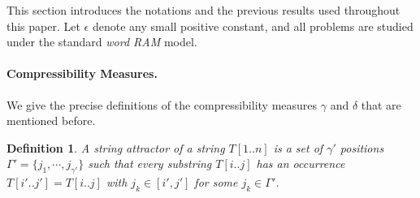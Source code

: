 \documentclass[smallabstract,smallcaptions]{dccpaper}
\newtheorem{definition}{Definition}
\newtheorem{theorem}{Theorem}
\begin{document}
	
	
	This section introduces the notations and the previous results used throughout this paper. Let $\epsilon$ denote any small positive constant, and all problems are studied under the standard {\em word RAM} model.
	
	\paragraph{Compressibility Measures.} We give the precise definitions of the compressibility measures $\gamma$ and $\delta$ that are mentioned before.
	
	\begin{definition}\cite{kempa2018roots}
		A string attractor of a string $T[1..n]$ is a set of $\gamma'$ positions $\Gamma'= \{j_1, \cdots, j_{\gamma'}\}$ such that every substring $T[i..j]$ has an occurrence $T[i'..j']=T[i..j]$ with $j_k \in [i', j']$ for some $j_k\in \Gamma'$.
	\end{definition}
	
\end{document}
